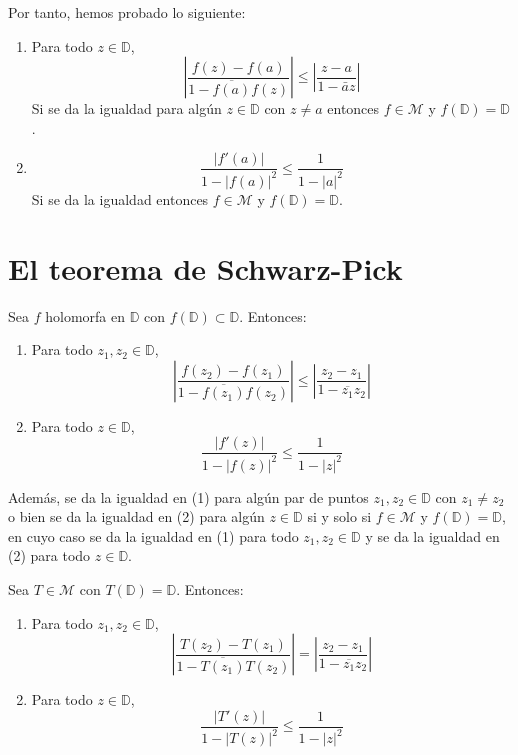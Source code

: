 Por tanto, hemos probado lo siguiente:
\begin{enumerate}
    \item Para todo $z \in \mathbb{D}$,
          $$\left|\frac{f(z)-f(a)}{1-\overline{f(a)}f(z)}\right| \leq \left|\frac{z-a}{1-\bar{a}z}\right|$$
          Si se da la igualdad para algún $z \in \mathbb{D}$ con $z \neq a$ entonces $f \in \mathcal{M}$ y $f(\mathbb{D}) = \mathbb{D}$.
    \item $$\frac{|f'(a)|}{1-|f(a)|^2} \leq \frac{1}{1-|a|^2}$$
          Si se da la igualdad entonces $f \in \mathcal{M}$ y $f(\mathbb{D}) = \mathbb{D}$.
\end{enumerate}

\section{El teorema de Schwarz-Pick}
\begin{theorem}
    Sea $f$ holomorfa en $\mathbb{D}$ con $f(\mathbb{D}) \subset \mathbb{D}$.
    Entonces:
    \begin{enumerate}
        \item Para todo $z_1, z_2 \in \mathbb{D}$,
              $$\left|\frac{f(z_2)-f(z_1)}{1-\overline{f(z_1)}f(z_2)}\right| \leq \left|\frac{z_2-z_1}{1-\overline{z_1}z_2}\right|$$
        \item Para todo $z \in \mathbb{D}$,
              $$\frac{|f'(z)|}{1-|f(z)|^2} \leq \frac{1}{1-|z|^2}$$
    \end{enumerate}

    Además, se da la igualdad en (1) para algún par de puntos $z_1, z_2 \in \mathbb{D}$ con $z_1 \neq z_2$ o bien se da la igualdad en (2) para algún $z \in \mathbb{D}$ si y solo si $f \in \mathcal{M}$ y $f(\mathbb{D}) = \mathbb{D}$, en cuyo caso se da la igualdad en (1) para todo $z_1, z_2 \in \mathbb{D}$ y se da la igualdad en (2) para todo $z \in \mathbb{D}$.
\end{theorem}

\begin{proposition}
    Sea $T \in \mathcal{M}$ con $T(\mathbb{D}) = \mathbb{D}$.
    Entonces:
    \begin{enumerate}
        \item Para todo $z_1, z_2 \in \mathbb{D}$,
              $$\left|\frac{T(z_2)-T(z_1)}{1-\overline{T(z_1)}T(z_2)}\right| = \left|\frac{z_2-z_1}{1-\overline{z_1}z_2}\right|$$
        \item Para todo $z \in \mathbb{D}$,
              $$\frac{|T'(z)|}{1-|T(z)|^2} \leq \frac{1}{1-|z|^2}$$
    \end{enumerate}
\end{proposition}

